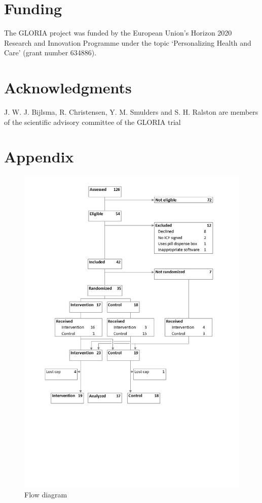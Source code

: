 \documentclass[twocolumn, issue, empirical, authordate]{jote-new-article}
\begin{document}
\printbibliography
\newpage


\section{Funding}
The GLORIA project was funded by the European Union’s Horizon 2020 Research and Innovation Programme under the topic ‘Personalizing Health and Care’ (grant number 634886).
\section{Acknowledgments}
J. W. J. Bijlsma, R. Christensen, Y. M. Smulders and S. H. Ralston are members of the scientific advisory committee of the GLORIA trial

\onecolumn
\section{Appendix}

\begin{figure}[h!]
\label{fig:fig1}
\includegraphics[width=.5\linewidth]{media/media/image1.jpg}
\caption{Flow diagram}
\end{figure}
\end{document}
